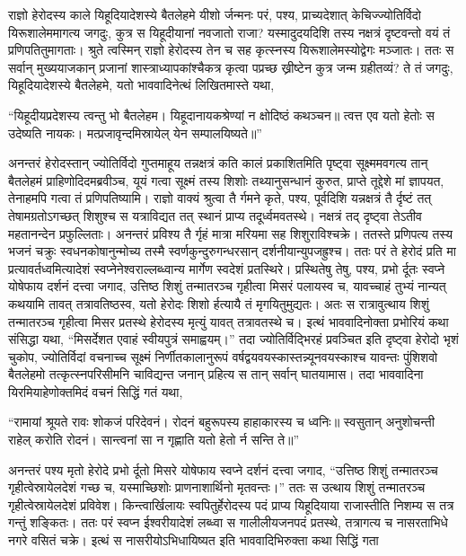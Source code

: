 \adhyAya
{}
\vakya राज्ञो हेरोदस्य काले यिहूदियादेशस्ये बैतलेहमे यीशो र्जन्मनः परं, पश्य, प्राच्यदेशात् केचिज्ज्योतिर्विदो यिरूशालेममागत्य जगदुः, कुत्र स यिहूदीयानां नवजातो राजा?
\vakya यस्मादुदयदिशि तस्य नक्षत्रं दृष्टवन्तो वयं तं प्रणिपतितुमागताः।
\vakya श्रुते त्वस्मिन् राज्ञो हेरोदस्य तेन च सह कृत्स्नस्य यिरूशालेमस्योद्वेगः मञ्जातः।
\vakya ततः स सर्वान् मुख्ययाजकान् प्रजानां शास्त्राध्यापकांश्चैकत्र कृत्वा पप्रच्छ ख्रीष्टेन कुत्र जन्म ग्रहीतव्यं?
\vakya ते तं जगदुः, यिहूदियादेशस्ये बैतलेहमे, यतो भाववादिनेत्थं लिखितमास्ते यथा,
\begin{poem}
\startwithvakya “यिहूदीयप्रदेशस्य त्वन्तु भो बैतलेहम।
\pline यिहूदानायकश्रेण्यां न क्षोदिष्ठं कथञ्चन॥
\pline त्वत्त एव यतो हेतोः स उदेष्यति नायकः।
\pline मत्प्रजावृन्दमिस्रायेल् येन सम्पालयिष्यते॥”
\end{poem}
\vakya अनन्तरं हेरोदस्तान् ज्योतिर्विदो गुप्तमाहूय तन्नक्षत्रं कति कालं प्रकाशितमिति पृष्ट्वा
\vakya सूक्ष्ममवगत्य तान् बैतलेहमं प्राहिणोदिदमब्रवीञ्च, यूयं गत्वा सूक्ष्मं तस्य शिशोः तथ्यानुसन्धानं कुरुत, प्राप्ते तूद्देशे मां ज्ञापयत, तेनाहमपि गत्वा तं प्रणिपतिष्यामि।
\vakya राज्ञो वाक्यं श्रुत्वा तै र्गमने कृते, पश्य, पूर्वदिशि यन्नक्षत्रं तै र्दृष्टं तत् तेषामग्रतोऽगच्छत् शिशुश्च स यत्राविद्यत तत् स्थानं प्राप्य तदूर्ध्वमवतस्थे।
\vakya नक्षत्रं तद् दृष्ट्वा तेऽतीव महतानन्देन प्रफुल्लिताः।
\vakya अनन्तरं प्रविश्य तै र्गृहं मात्रा मरियमा सह शिशुराविश्चक्रे।
\vakya ततस्ते प्रणिपत्य तस्य भजनं चक्रुः स्वधनकोषानुन्मोच्य तस्मै स्वर्णकुन्दुरुगन्धरसान् दर्शनीयान्युपजह्रुश्च। ततः परं ते हेरोदं प्रति मा प्रत्यावर्तध्वमित्यादेशं स्वप्नेनेश्वराल्लब्ध्वान्य मार्गेण स्वदेशं प्रतस्थिरे।
\vakya प्रस्थितेषु तेषु, पश्य, प्रभो र्दूतः स्वप्ने योषेफाय दर्शनं दत्त्वा जगाद, उत्तिष्ठ शिशुं तन्मातरञ्च गृहीत्वा मिसरं पलायस्व च, यावच्चाहं तुभ्यं नान्यत् कथयामि तावत् तत्रावतिष्ठस्व, यतो हेरोदः शिशो र्हत्यायै तं मृगयितुमुद्यतः।
\vakya अतः स रात्रावुत्थाय शिशुं तन्मातरञ्च गृहीत्वा मिसर प्रतस्थे हेरोदस्य मृत्युं यावत् तत्रावतस्थे च।
\vakya इत्थं भाववादिनोक्ता प्रभोरियं कथा संसिद्धा यथा, “मिसर्देशत एवाहं स्वीयपुत्रं समाह्वयम्।”
\vakya तदा ज्योतिर्विद्भिरहं प्रवञ्चित इति दृष्ट्वा हेरोदो भृशं चुकोप, ज्योतिर्विदां वचनाच्च सूक्ष्मं निर्णीतकालानुरूपं वर्षद्वयवयस्कास्तन्न्यूनवयस्काश्च यावन्तः पुंशिशवो बैतलेहमो तत्कृत्स्नपरिसीमनि चाविद्यन्त जनान् प्रहित्य स तान् सर्वान् घातयामास।
\vakya तदा भाववादिना यिरमियाहेणोक्तमिदं वचनं सिद्धिं गतं यथा,
\begin{poem}
\startwithvakya “रामायां श्रूयते रावः शोकजं परिदेवनं।
\pline रोदनं बहुरूपस्य हाहाकारस्य च ध्वनिः॥
\pline स्वसुतान् अनुशोचन्ती राहेल् करोति रोदनं।
\pline सान्त्वनां सा न गृह्णाति यतो हेतो र्न सन्ति ते॥”
\end{poem}
\vakya अनन्तरं पश्य मृतो हेरोदे प्रभो र्दूतो मिसरे योषेफाय स्वप्ने दर्शनं दत्त्वा जगाद,
\vakya “उत्तिष्ठ शिशुं तन्मातरञ्च गृहीत्वेस्रायेलदेशं गच्छ च, यस्माच्छिशोः प्राणनाशार्थिनो मृतवन्तः।”
\vakya ततः स उत्थाय शिशुं तन्मातरञ्च गृहीत्वेस्रायेलदेशं प्रविवेश।
\vakya किन्त्वार्खिलायः स्वपितुर्हेरोदस्य पदं प्राप्य यिहूदियाया राजास्तीति निशम्य स तत्र गन्तुं शङ्कितः।
\vakya ततः परं स्वप्न ईश्वरीयादेशं लब्ध्वा स गालीलीयजनपदं प्रतस्थे, तत्रागत्य च नासरताभिधे नगरे वसितं चक्रे। इत्थं स नासरीयोऽभिधायिष्यत इति भाववादिभिरुक्ता कथा सिद्धिं गता\eoc
